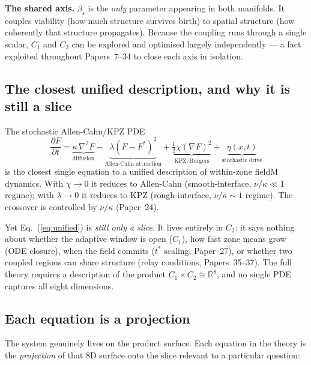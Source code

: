 \documentclass[11pt]{article}
\begin{document}
\medskip
\textbf{The shared axis.}
$\beta_s$ is the \emph{only} parameter appearing in both manifolds.
It couples viability (how much structure survives birth) to spatial structure
(how coherently that structure propagates).
Because the coupling runs through a single scalar, $C_1$ and $C_2$ can be
explored and optimised largely independently --- a fact exploited throughout
Papers~7--34 to close each axis in isolation.

\subsection{The closest unified description, and why it is still a slice}

The stochastic Allen-Cahn/KPZ PDE
\begin{equation}
\frac{\partial F}{\partial t}
  = \underbrace{\kappa\,\nabla^2 F}_{\text{diffusion}}
  - \underbrace{\lambda(F - F^*)^2}_{\text{Allen-Cahn attraction}}
  + \underbrace{\tfrac{1}{2}\chi(\nabla F)^2}_{\text{KPZ/Burgers}}
  + \underbrace{\eta(x,t)}_{\text{stochastic drive}}
\label{eq:unified}
\end{equation}
is the closest single equation to a unified description of within-zone fieldM dynamics.
With $\chi \to 0$ it reduces to Allen-Cahn (smooth-interface, $\nu/\kappa \ll 1$ regime);
with $\lambda \to 0$ it reduces to KPZ (rough-interface, $\nu/\kappa \sim 1$ regime).
The crossover is controlled by $\nu/\kappa$ (Paper~24).

Yet Eq.~(\ref{eq:unified}) is \emph{still only a slice}.
It lives entirely in $C_2$: it says nothing about whether the adaptive window is
open ($C_1$), how fast zone means grow (ODE closure), when the field commits
($t^*$ scaling, Paper~27), or whether two coupled regions can share structure
(relay conditions, Papers~35--37).
The full theory requires a description of the product $C_1 \times C_2 \cong \mathbb{R}^8$,
and no single PDE captures all eight dimensions.

\subsection{Each equation is a projection}

The system genuinely lives on the product surface.
Each equation in the theory is the \emph{projection} of that 8D surface onto the
slice relevant to a particular question:
\end{document}
